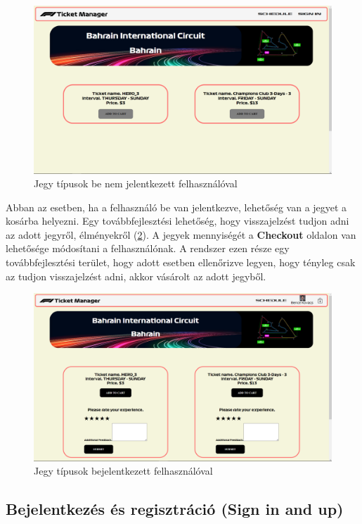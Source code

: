 \begin{figure}[!h]
	\centering
	\includegraphics[scale=0.2]{images/tickets}
	\caption{Jegy típusok be nem jelentkezett felhasználóval}
	\label{abra:ticketsUA}
\end{figure}

Abban az esetben, ha a felhasználó be van jelentkezve, lehetőség van a jegyet a kosárba helyezni. Egy továbbfejlesztési lehetőség, hogy visszajelzést tudjon adni az adott jegyről, élményekről (\ref{abra:ticketsAuth}). A jegyek mennyiségét a \textbf{Checkout} oldalon van lehetősége módosítani a felhasználónak. A rendszer ezen része egy továbbfejlesztési terület, hogy adott esetben ellenőrizve legyen, hogy tényleg csak az tudjon visszajelzést adni, akkor vásárolt az adott jegyből. 

\begin{figure}[!h]
	\centering
	\includegraphics[scale=0.2]{images/ticketsAuth}
	\caption{Jegy típusok bejelentkezett felhasználóval}
	\label{abra:ticketsAuth}
\end{figure}

\subsection {Bejelentkezés és regisztráció (Sign in and up)}

